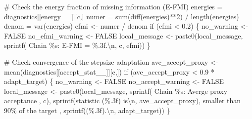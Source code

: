 \documentclass[
  letterpaper,
  DIV=11,
  numbers=noendperiod]{scrartcl}
\newenvironment{Shaded}{\begin{snugshade}}{\end{snugshade}}
\newcommand{\CommentTok}[1]{\textcolor[rgb]{0.37,0.37,0.37}{#1}}
\newcommand{\ConstantTok}[1]{\textcolor[rgb]{0.56,0.35,0.01}{#1}}
\newcommand{\ControlFlowTok}[1]{\textcolor[rgb]{0.00,0.23,0.31}{#1}}
\newcommand{\DecValTok}[1]{\textcolor[rgb]{0.68,0.00,0.00}{#1}}
\newcommand{\FloatTok}[1]{\textcolor[rgb]{0.68,0.00,0.00}{#1}}
\newcommand{\FunctionTok}[1]{\textcolor[rgb]{0.28,0.35,0.67}{#1}}
\newcommand{\NormalTok}[1]{\textcolor[rgb]{0.00,0.23,0.31}{#1}}
\newcommand{\OtherTok}[1]{\textcolor[rgb]{0.00,0.23,0.31}{#1}}
\newcommand{\SpecialCharTok}[1]{\textcolor[rgb]{0.37,0.37,0.37}{#1}}
\newcommand{\StringTok}[1]{\textcolor[rgb]{0.13,0.47,0.30}{#1}}
\begin{document}
\begin{Shaded}
\begin{Highlighting}[]
    \CommentTok{\# Check the energy fraction of missing information (E{-}FMI)}
\NormalTok{    energies }\OtherTok{=}\NormalTok{ diagnostics[[}\StringTok{\textquotesingle{}energy\_\_\textquotesingle{}}\NormalTok{]][c,]}
\NormalTok{    numer }\OtherTok{=} \FunctionTok{sum}\NormalTok{(}\FunctionTok{diff}\NormalTok{(energies)}\SpecialCharTok{**}\DecValTok{2}\NormalTok{) }\SpecialCharTok{/} \FunctionTok{length}\NormalTok{(energies)}
\NormalTok{    denom }\OtherTok{=} \FunctionTok{var}\NormalTok{(energies)}
\NormalTok{    efmi }\OtherTok{\textless{}{-}}\NormalTok{ numer }\SpecialCharTok{/}\NormalTok{ denom}
    \ControlFlowTok{if}\NormalTok{ (efmi }\SpecialCharTok{\textless{}} \FloatTok{0.2}\NormalTok{) \{}
\NormalTok{      no\_warning }\OtherTok{\textless{}{-}} \ConstantTok{FALSE}
\NormalTok{      no\_efmi\_warning }\OtherTok{\textless{}{-}} \ConstantTok{FALSE}
\NormalTok{      local\_message }\OtherTok{\textless{}{-}} 
        \FunctionTok{paste0}\NormalTok{(local\_message, }
               \FunctionTok{sprintf}\NormalTok{(}\StringTok{\textquotesingle{}  Chain \%s: E{-}FMI = \%.3f.}\SpecialCharTok{\textbackslash{}n}\StringTok{\textquotesingle{}}\NormalTok{, c, efmi))}
\NormalTok{    \}}
    
    \CommentTok{\# Check convergence of the stepsize adaptation}
\NormalTok{    ave\_accept\_proxy }\OtherTok{\textless{}{-}} \FunctionTok{mean}\NormalTok{(diagnostics[[}\StringTok{\textquotesingle{}accept\_stat\_\_\textquotesingle{}}\NormalTok{]][c,])}
    \ControlFlowTok{if}\NormalTok{ (ave\_accept\_proxy }\SpecialCharTok{\textless{}} \FloatTok{0.9} \SpecialCharTok{*}\NormalTok{ adapt\_target) \{}
\NormalTok{      no\_warning }\OtherTok{\textless{}{-}} \ConstantTok{FALSE}
\NormalTok{      no\_accept\_warning }\OtherTok{\textless{}{-}} \ConstantTok{FALSE}
\NormalTok{      local\_message }\OtherTok{\textless{}{-}} 
        \FunctionTok{paste0}\NormalTok{(local\_message,}
               \FunctionTok{sprintf}\NormalTok{(}\StringTok{\textquotesingle{}  Chain \%s: Averge proxy acceptance \textquotesingle{}}\NormalTok{, c),}
               \FunctionTok{sprintf}\NormalTok{(}\StringTok{\textquotesingle{}statistic (\%.3f) is}\SpecialCharTok{\textbackslash{}n}\StringTok{\textquotesingle{}}\NormalTok{, ave\_accept\_proxy),}
                       \StringTok{\textquotesingle{}           smaller than 90\% of the target \textquotesingle{}}\NormalTok{,}
               \FunctionTok{sprintf}\NormalTok{(}\StringTok{\textquotesingle{}(\%.3f).}\SpecialCharTok{\textbackslash{}n}\StringTok{\textquotesingle{}}\NormalTok{, adapt\_target))}
\NormalTok{    \}}
    

\end{Highlighting}
\end{Shaded}
\end{document}
